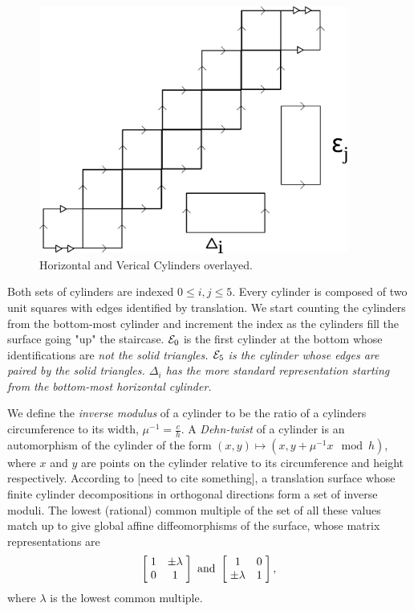 \documentclass[]{article}
\begin{document}
\begin{figure}[H]
\centering
\includegraphics[width=4in]{cylinderdecomp.pdf}
\caption{Horizontal and Verical Cylinders overlayed.}
\label{fig:decomp}
\end{figure}

Both sets of cylinders are indexed $0\leq i, j \leq 5$. Every cylinder is composed of two unit squares with edges identified by translation. We start counting the cylinders from the bottom-most cylinder and increment the index as the cylinders fill the surface going "up" the staircase. $\small{\mathcal{E}}_0$ is the first cylinder at the bottom whose identifications are \em{not} \normalfont the solid triangles. $\small{\mathcal{E}}_5$ is the cylinder whose edges are paired by the solid triangles. $\Delta_{i}$ has the more standard representation starting from the bottom-most horizontal cylinder. 

We define the \emph{inverse modulus} of a cylinder to be the ratio of a cylinders circumference to its width, $\mu^{-1}=\frac{c}{h}$. A \emph{Dehn-twist} of a cylinder is an automorphism of the cylinder of the form  $(x,y)\mapsto(x,y+\mu^{-1} x \mod{h})$, where $x$ and $y$ are points on the cylinder relative to its circumference and height respectively. According to [need to cite something], a translation surface whose finite cylinder decompositions in orthogonal directions form a set of inverse moduli. The lowest (rational) common multiple of the set of all these values match up to give global affine diffeomorphisms of the surface, whose matrix representations are 
\begin{equation*}
\left[ \hspace{1mm} \begin{matrix}
				1 & \pm \lambda\\
				0 & 1
			\end{matrix}\hspace{1mm}\right] \text{ and }
			\left[ \hspace{1mm} \begin{matrix}
							1 & 0\\
							\pm \lambda & 1
						\end{matrix}\hspace{1mm}\right],
\end{equation*}
where $\lambda$ is the lowest common multiple.
\end{document}
